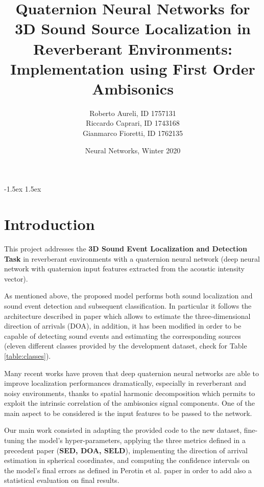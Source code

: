 \documentclass[11pt]{article}
\title{Quaternion Neural Networks for 3D Sound Source Localization in Reverberant Environments: Implementation using First Order Ambisonics}
\author{Roberto Aureli, ID 1757131\\
		Riccardo Caprari, ID 1743168\\
		Gianmarco Fioretti, ID 1762135}
\date{Neural Networks, Winter 2020}
\begin{document}
\maketitle

\vspace{10px}

\openup -1.5ex
\tableofcontents
\openup 1.5ex

\newpage
\section{Introduction}\label{cha:intro}

This project addresses the \textbf{3D Sound Event Localization and Detection Task} in reverberant environments with a  quaternion neural network (deep neural network with quaternion input features extracted from the acoustic intensity vector).\newline

\noindent
As mentioned above, the proposed model performs both sound localization and sound event detection and subsequent classification. In particular it follows the architecture described in paper \cite{paper2020} which allows to estimate the three-dimensional direction of arrivals (DOA), in addition, it has been modified in order to be capable of detecting sound events and estimating the corresponding sources (eleven different classes provided by the development dataset, check for Table \ref{table:classes}).\newline

\noindent
Many recent works have proven that deep quaternion neural networks are able to improve localization performances dramatically, especially in reverberant and noisy environments, thanks to spatial harmonic decomposition which permits to exploit the intrinsic correlation of the ambisonics signal components. One of the main aspect to be considered is the input features to be passed to the network.\newline

\noindent
Our main work consisted in adapting the provided code to the new dataset, fine-tuning the model's hyper-parameters, applying the three metrics defined in a precedent paper \cite{paper2019} (\textbf{SED, DOA, SELD}), implementing the direction of arrival estimation in spherical coordinates, and computing the confidence intervals on the model's final errors as defined in Perotin et al. paper \cite{paper2018} in order to add also a statistical evaluation on final results.
\end{document}
